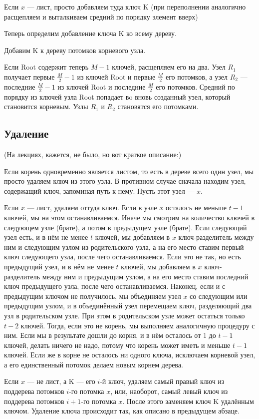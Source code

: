 	Если $x$ — лист, просто добавляем туда ключ K (при переполнении аналогично расщепляем и выталкиваем средний по порядку элемент вверх)

Теперь определим добавление ключа K ко всему дереву.

    Добавим K к дереву потомков корневого узла.

    Если Root содержит теперь $M-1$ ключей, расщепляем его на два. Узел $R_{1}$ получает первые $\frac{M}{2}-1$ из ключей Root и первые $\frac{M}{2}$ его потомков, а узел $R_{2}$ — последние $\frac{M}{2}-1$ из ключей Root и последние $\frac{M}{2}$ его потомков. Средний по порядку из ключей узла Root попадает вo вновь созданный узел, который становится корневым. Узлы $R_{1}$ и $R_{2}$ становятся его потомками.

\subsection*{Удаление}
(На лекциях, кажется, не было, но вот краткое описание:)

Если корень одновременно является листом, то есть в дереве всего один узел, мы просто удаляем ключ из этого узла. В противном случае сначала находим узел, содержащий ключ, запоминая путь к нему. Пусть этот узел — $x$.

Если $x$ — лист, удаляем оттуда ключ. Если в узле $x$ осталось не меньше $t-1$ ключей, мы на этом останавливаемся. Иначе мы смотрим на количество ключей в следующем узле (брате), а потом в предыдущем узле (брате). Если следующий узел есть, и в нём не менее $t$ ключей, мы добавляем в $x$ ключ-разделитель между ним и следующим узлом из родительского узла, а на его место ставим первый ключ следующего узла, после чего останавливаемся. Если это не так, но есть предыдущий узел, и в нём не менее $t$ ключей, мы добавляем в $x$ ключ-разделитель между ним и предыдущим узлом, а на его место ставим последний ключ предыдущего узла, после чего останавливаемся. Наконец, если и с предыдущим ключом не получилось, мы объединяем узел $x$ со следующим или предыдущим узлом, и в объединённый узел перемещаем ключ, разделяющий два узл в родительском узле. При этом в родительском узле может остаться только $t-2$ ключей. Тогда, если это не корень, мы выполняем аналогичную процедуру с ним. Если мы в результате дошли до корня, и в нём осталось от 1 до $t-1$  ключей, делать ничего не надо, потому что корень может иметь и меньше $t-1$ ключей. Если же в корне не осталось ни одного ключа, исключаем корневой узел, а его единственный потомок делаем новым корнем дерева.


Если $x$ — не лист, а K — его $i$-й ключ, удаляем самый правый ключ из поддерева потомков $i$-го потомка $x$, или, наоборот, самый левый ключ из поддерева потомков $i+1$-го потомка $x$. После этого заменяем ключ K удалённым ключом. Удаление ключа происходит так, как описано в предыдущем абзаце. 

